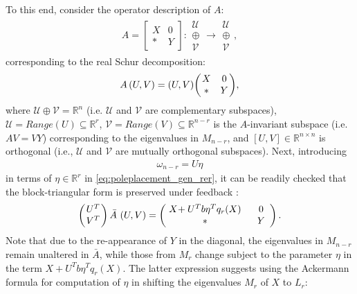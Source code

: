 \documentclass[conference]{IEEEtran}
\newcommand{\msu}{\mathcal{U}}
\newcommand{\msv}{\mathcal{V}}
\newcommand{\hspm}{\hspace{-2pt}}
\newcommand{\acl}{\bar{A}}
\newcommand{\om}{\omega}
\begin{document}
To this end, consider the operator description of $A$:
\vspace{-5pt}
\begin{align}
\label{eq:geom1}
{A} = \begin{bmatrix} X & 0 \\ \ast & Y \end{bmatrix} : \begin{matrix} \mathcal{U} \\ \oplus \\ \mathcal{V} \end{matrix} \rightarrow \begin{matrix} \mathcal{U} \\ \oplus \\ \mathcal{V} \end{matrix},
\end{align}
\vspace{-5pt}
 corresponding to the real Schur decomposition:
\begin{align}
\label{eq:werew}
A\, (U, V)= (U, V) {\left(\hspm \hspm\begin{array}{cc}
X & 0 \\
\ast &  Y
\end{array}\hspm\hspm \right)},
\end{align}
where $\msu\oplus\msv=\mathbb{R}^n$ (i.e. $\msu$ and $\msv$ are complementary subspaces), $\msu=\textit{Range}(U)\subseteq\mathbb{R}^{r}$, $\msv=\textit{Range}(V)\subseteq\mathbb{R}^{n-r}$ is the $A$-invariant subspace (i.e. $AV=VY$) corresponding to the eigenvalues in $M_{n-r}$, and $[U,V]\in\mathbb{R}^{n \times n}$ is orthogonal (i.e., $\msu$ and $\msv$ are mutually orthogonal subspaces).
Next, introducing \begin{align}
\label{eq:kappa}
\om_{n-r} = U \eta
\end{align}
in terms of $\eta\in\mathbb{R}^{r}$ in \eqref{eq:poleplacement_gen_rer}, it can be readily checked that the block-triangular form is preserved under feedback \cite{Saad86}:
\begin{align}
\left(\hspm\hspm\begin{array}{c}U^T \\ V^T\end{array}\hspm\hspm\right)
\acl\,\, (U, V) = \left(\hspm\begin{array}{cc}
X\hspm + U^Tb\eta^T q_{r}(X) & ~~0 \\
\ast & ~~Y
\end{array}\right).
\end{align}
Note that due to the re-appearance of $Y$ in the diagonal, the eigenvalues in  $M_{n-r}$ remain unaltered in $\acl$, while those from  $M_{r}$ change subject to the parameter $\eta$ in the term $X + U^Tb\eta^T q_r(X)$.  The latter expression suggests using the Ackermann formula for computation of $\eta$ in shifting the eigenvalues $M_{r}$ of $X$ to $L_r$:
\end{document}
